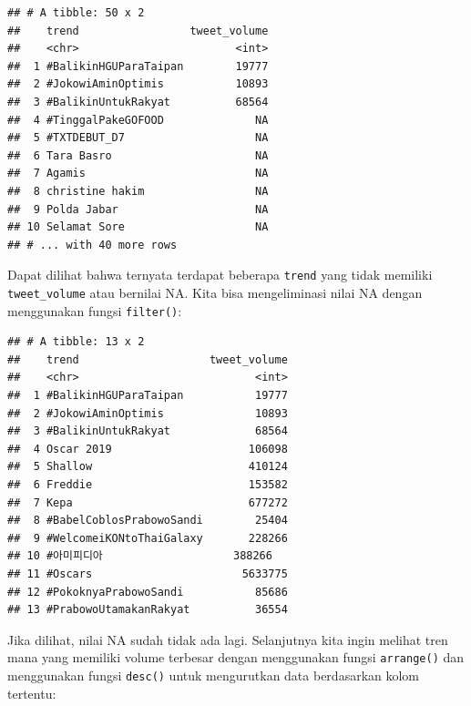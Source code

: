 \documentclass[]{tufte-handout}
\newenvironment{Shaded}{}{}
\newcommand{\KeywordTok}[1]{\textcolor[rgb]{0.00,0.44,0.13}{\textbf{#1}}}
\newcommand{\StringTok}[1]{\textcolor[rgb]{0.25,0.44,0.63}{#1}}
\newcommand{\CommentTok}[1]{\textcolor[rgb]{0.38,0.63,0.69}{\textit{#1}}}
\newcommand{\OperatorTok}[1]{\textcolor[rgb]{0.40,0.40,0.40}{#1}}
\newcommand{\NormalTok}[1]{#1}
\begin{document}
\begin{verbatim}
## # A tibble: 50 x 2
##    trend                 tweet_volume
##    <chr>                        <int>
##  1 #BalikinHGUParaTaipan        19777
##  2 #JokowiAminOptimis           10893
##  3 #BalikinUntukRakyat          68564
##  4 #TinggalPakeGOFOOD              NA
##  5 #TXTDEBUT_D7                    NA
##  6 Tara Basro                      NA
##  7 Agamis                          NA
##  8 christine hakim                 NA
##  9 Polda Jabar                     NA
## 10 Selamat Sore                    NA
## # ... with 40 more rows
\end{verbatim}

Dapat dilihat bahwa ternyata terdapat beberapa \texttt{trend} yang tidak
memiliki \texttt{tweet\_volume} atau bernilai NA. Kita bisa
mengeliminasi nilai NA dengan menggunakan fungsi \texttt{filter()}:

\begin{Shaded}
\end{Shaded}

\begin{verbatim}
## # A tibble: 13 x 2
##    trend                    tweet_volume
##    <chr>                           <int>
##  1 #BalikinHGUParaTaipan           19777
##  2 #JokowiAminOptimis              10893
##  3 #BalikinUntukRakyat             68564
##  4 Oscar 2019                     106098
##  5 Shallow                        410124
##  6 Freddie                        153582
##  7 Kepa                           677272
##  8 #BabelCoblosPrabowoSandi        25404
##  9 #WelcomeiKONtoThaiGalaxy       228266
## 10 #아미피디아                    388266
## 11 #Oscars                       5633775
## 12 #PokoknyaPrabowoSandi           85686
## 13 #PrabowoUtamakanRakyat          36554
\end{verbatim}

Jika dilihat, nilai NA sudah tidak ada lagi. Selanjutnya kita ingin
melihat tren mana yang memiliki volume terbesar dengan menggunakan
fungsi \texttt{arrange()} dan menggunakan fungsi \texttt{desc()} untuk
mengurutkan data berdasarkan kolom tertentu:
\end{document}
